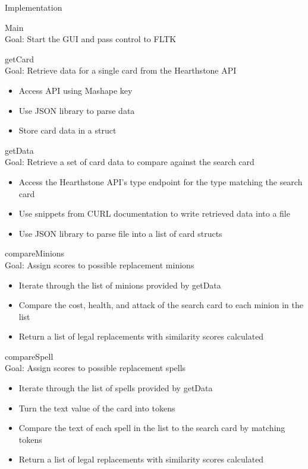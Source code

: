 \documentclass[aspectratio=169]{beamer}
\begin{document}
\begin{frame}[allowframebreaks]{Implementation}

Main\\
Goal: Start the GUI and pass control to FLTK
\pagebreak

getCard\\
Goal: Retrieve data for a single card from the Hearthstone API
\begin{itemize}
\item Access API using Mashape key
\item Use JSON library to parse data
\item Store card data in a struct
\end{itemize}
\pagebreak

getData\\
Goal: Retrieve a set of card data to compare against the search card
\begin{itemize}
\item Access the Hearthstone API's type endpoint for the type matching the 
search card
\item Use snippets from CURL documentation to write retrieved data into a file
\item Use JSON library to parse file into a list of card structs
\end{itemize}
\pagebreak

compareMinions\\
Goal: Assign scores to possible replacement minions
\begin{itemize}
\item Iterate through the list of minions provided by getData
\item Compare the cost, health, and attack of the search card to each minion in
the list
\item Return a list of legal replacements with similarity scores calculated
\end{itemize}
\pagebreak

compareSpell\\
Goal: Assign scores to possible replacement spells
\begin{itemize}
\item Iterate through the list of spells provided by getData
\item Turn the text value of the card into tokens
\item Compare the text of each spell in the list to the search card by matching
tokens
\item Return a list of legal replacements with similarity scores calculated
\end{itemize}
\pagebreak


\end{frame}
\end{document}
